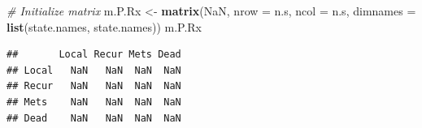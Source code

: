 \documentclass[]{article}
\newenvironment{Shaded}{\begin{snugshade}}{\end{snugshade}}
\newcommand{\KeywordTok}[1]{\textcolor[rgb]{0.13,0.29,0.53}{\textbf{#1}}}
\newcommand{\DataTypeTok}[1]{\textcolor[rgb]{0.13,0.29,0.53}{#1}}
\newcommand{\StringTok}[1]{\textcolor[rgb]{0.31,0.60,0.02}{#1}}
\newcommand{\CommentTok}[1]{\textcolor[rgb]{0.56,0.35,0.01}{\textit{#1}}}
\newcommand{\OtherTok}[1]{\textcolor[rgb]{0.56,0.35,0.01}{#1}}
\newcommand{\NormalTok}[1]{#1}
\theoremstyle{definition}
\theoremstyle{definition}
\theoremstyle{definition}
\theoremstyle{remark}
\begin{document}
\begin{Shaded}
\begin{Highlighting}[]
\CommentTok{# Initialize matrix}
\NormalTok{m.P.Rx <-}\StringTok{ }\KeywordTok{matrix}\NormalTok{(}\OtherTok{NaN}\NormalTok{, }
                 \DataTypeTok{nrow =}\NormalTok{ n.s, }\DataTypeTok{ncol =}\NormalTok{ n.s, }
                 \DataTypeTok{dimnames =} \KeywordTok{list}\NormalTok{(state.names, state.names))}
\NormalTok{m.P.Rx}
\end{Highlighting}
\end{Shaded}

\begin{verbatim}
##       Local Recur Mets Dead
## Local   NaN   NaN  NaN  NaN
## Recur   NaN   NaN  NaN  NaN
## Mets    NaN   NaN  NaN  NaN
## Dead    NaN   NaN  NaN  NaN
\end{verbatim}
\end{document}
